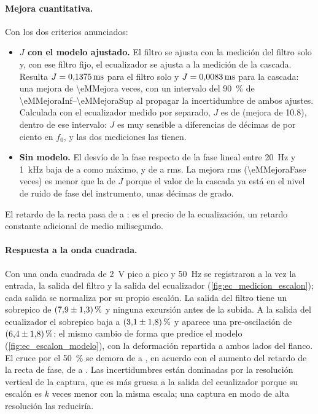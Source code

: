 \paragraph{Mejora cuantitativa.} Con los dos criterios anunciados:
\begin{itemize}
  \item \textbf{$J$ con el modelo ajustado.} El filtro se ajusta con la medición del filtro solo y, con ese filtro fijo, el ecualizador se ajusta a la
        medición de la cascada. Resulta $J = \qr{4}{\eMJFil}{\milli\second}$ para el filtro solo y $J = \qr{4}{\eMJCas}{\milli\second}$ para la cascada:
        una mejora de \num{\eMMejora} veces, con un intervalo del \qty{90}{\percent} de \numrange{\eMMejoraInf}{\eMMejoraSup} al propagar la incertidumbre
        de ambos ajustes. Calculada con el ecualizador medido por separado, $J$ es de  (mejora de \num{10.8}),
        dentro de ese intervalo: $J$ es muy sensible a diferencias de décimas de por ciento en $f_0$, y las dos mediciones las tienen.
  \item \textbf{Sin modelo.} El desvío de la fase respecto de la fase lineal entre \qty{20}{\hertz} y \qty{1}{\kilo\hertz} baja de
         a  como máximo, y de  a  rms.
        La mejora rms (\num{\eMMejoraFase} veces) es menor que la de $J$ porque el valor de la cascada ya está en el nivel de ruido de fase del
        instrumento, unas décimas de grado.
\end{itemize}
El retardo de la recta pasa de  a : es el precio de la ecualización, un
retardo constante adicional de medio milisegundo.

\ifdefined\eEscESobre
\paragraph{Respuesta a la onda cuadrada.} Con una onda cuadrada de \qty{2}{\volt} pico a pico y \qty{50}{\hertz} se registraron a la vez la entrada,
la salida del filtro y la salida del ecualizador (\cref{fig:ec_medicion_escalon}); cada salida se normaliza por su propio escalón. La salida del
filtro tiene un sobrepico de $(\nr{1}{\eEscFSobre} \pm \nr{1}{\eEscFU})\,\%$ y ninguna excursión antes de la subida. A la salida del ecualizador
el sobrepico baja a $(\nr{1}{\eEscESobre} \pm \nr{1}{\eEscEU})\,\%$ y aparece una pre-oscilación de $(\nr{1}{\eEscEPre} \pm \nr{1}{\eEscEU})\,\%$:
el mismo cambio de forma que predice el modelo (\cref{fig:ec_escalon_modelo}), con la deformación repartida a ambos lados del flanco. El cruce
por el \qty{50}{\percent} se demora de  a , en acuerdo con el aumento del retardo
de la recta de fase, de  a . Las incertidumbres están dominadas por la resolución vertical de la captura, que es
más gruesa a la salida del ecualizador porque su escalón es $k$ veces menor con la misma escala; una captura en modo de alta resolución las
reduciría.


